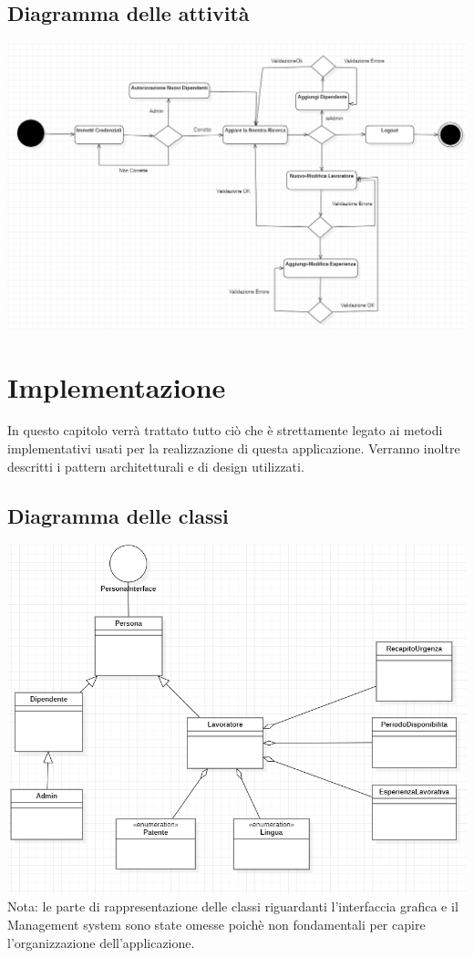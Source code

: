 \documentclass[ 4paper,11pt,openany]{book}
\begin{document}
\section{Diagramma delle attività}
\includegraphics[width=185mm]{attivita.png}

\chapter{Implementazione}
In questo capitolo verrà trattato tutto ciò che è strettamente legato ai metodi implementativi usati per la realizzazione di questa applicazione. Verranno inoltre descritti i pattern architetturali e di design utilizzati.

\section{Diagramma delle classi}
\includegraphics[width=185mm]{classi.png}
Nota: le parte di rappresentazione delle classi riguardanti l'interfaccia grafica e il Management system sono state omesse poichè non fondamentali per capire l'organizzazione dell'applicazione.
\end{document}
